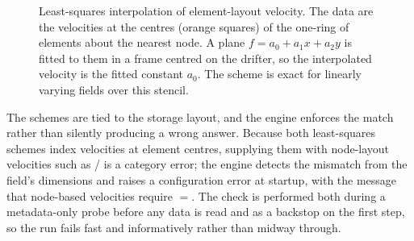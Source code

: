\begin{figure}[t]
\centering
{}
\caption{Least-squares interpolation of element-layout velocity. The data are the
velocities at the centres (orange squares) of the one-ring of elements about the
nearest node. A plane $f=a_0+a_1x+a_2y$ is fitted to them in a frame centred on the
drifter, so the interpolated velocity is the fitted constant $a_0$. The scheme is
exact for linearly varying fields over this stencil.}
\label{fig:leastsq}
\end{figure}

The schemes are tied to the storage layout, and the engine enforces the match rather than silently
producing a wrong answer. Because both least-squares schemes index velocities at element centres,
supplying them with node-layout velocities such as / is a category error; the
engine detects the mismatch from the field's dimensions and raises a configuration error at startup,
with the message that node-based velocities require ${}={}$. The
check is performed both during a metadata-only probe before any data is read and as a backstop on the
first step, so the run fails fast and informatively rather than midway through.


